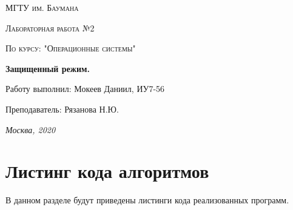 \documentclass[12pt]{report}
\begin{document}
	\begin{titlepage}
		\centering
		{\scshape\LARGE МГТУ им. Баумана \par}
		\vspace{3cm}
		{\scshape\Large Лабораторная работа №2\par}
		\vspace{0.5cm}	
		{\scshape\Large По курсу: "Операционные системы"\par}
		\vspace{1.5cm}
		\centering
		{\huge\bfseries Защищенный режим.\par}
		\vspace{2cm}
		\Large Работу выполнил: Мокеев Даниил, ИУ7-56\par
		\vspace{0.5cm}
		\Large Преподаватель:  Рязанова Н.Ю.\par
		
		\vfill
		\large \textit {Москва, 2020} \par
	\end{titlepage}
	
	
	\newpage
	
	\chapter{Листинг кода алгоритмов}
	В данном разделе будут приведены листинги кода реализованных программ. 
	
\end{document}
